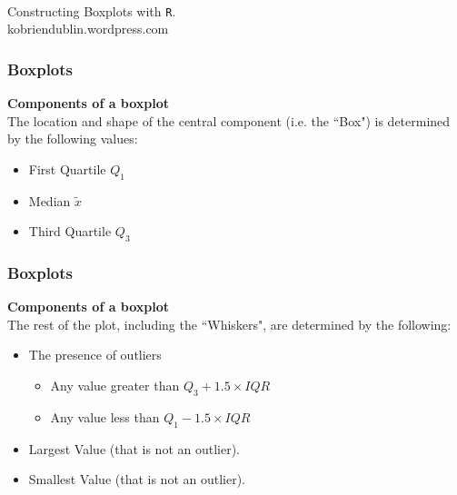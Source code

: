 \documentclass{beamer}
\begin{document}
\begin{frame}

{\Large
\\
\begin{center}
\vspace{1.3cm}
Constructing Boxplots with \texttt{R}.\\
\vspace{1.3cm}
{\large kobriendublin.wordpress.com}
\end{center}
}


\end{frame}

\begin{frame}
\frametitle{Boxplots}
{
\Large
\vspace{-0.7cm}
\textbf{Components of a boxplot}\\
\vspace{0.4cm}
The location and shape of the central component (i.e. the ``Box") is determined by the following values:
\begin{itemize}
\item First Quartile $Q_1$
\item Median $\tilde{x}$
\item Third Quartile $Q_3$
\end{itemize}
}
\end{frame}


\begin{frame}
\frametitle{Boxplots}
{
\Large
\textbf{Components of a boxplot}\\
\vspace{0.4cm}
The rest of the plot, including the ``Whiskers", are determined by the following:
\vspace{0.6cm}
\begin{itemize}
\item The presence of outliers
\begin{itemize}
\item Any value greater than $Q_3 + 1.5 \times IQR $
\item Any value less than $Q_1 - 1.5 \times IQR $
\end{itemize}
\item Largest Value (that is not an outlier).
\item Smallest Value (that is not an outlier).
\end{itemize}
}
\end{frame}
\end{document}
